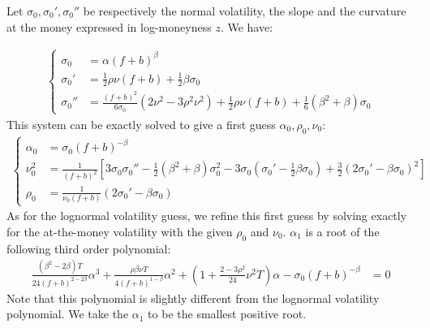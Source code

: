 \documentclass[]{rAMF2e}
\begin{document}
Let $\sigma_0, \sigma_0', \sigma_0''$ be respectively the normal volatility, the slope and the curvature at the money expressed in log-moneyness $z$. We have:

\begin{align}
\begin{cases}
\sigma_0 &= \alpha (f+b)^{\beta}\\
\sigma_0' &= \frac{1}{2}\rho \nu (f+b) + \frac{1}{2} \beta \sigma_0\\
\sigma_0'' &= \frac{(f+b)^2}{6\sigma_0}(2\nu^2 - 3\rho^2\nu^2)+\frac{1}{2} \rho \nu (f+b)+\frac{1}{6}(\beta^2+\beta)\sigma_0
\end{cases}
\end{align}
This system can be exactly solved to give a first guess $\alpha_0, \rho_0,\nu_0$:
\begin{align}
  \begin{cases}
\alpha_0 &=  \sigma_0 (f+b)^{-\beta}\\
\nu_0^2 &= \frac{1}{(f+b)^2}\left[ 3\sigma_0\sigma_0''-\frac{1}{2}(\beta^2+\beta)\sigma_0^2-3\sigma_0(\sigma_0'-\frac{1}{2}\beta\sigma_0) +\frac{3}{2}\left(2\sigma_0'-\beta\sigma_0\right)^2\right] \\
\rho_0 &= \frac{1}{\nu_0 (f+b)}\left(2\sigma_0'-\beta\sigma_0\right) 
\end{cases} 
\end{align}
As for the lognormal volatility guess, we refine this first guess by solving exactly for the at-the-money volatility with the given $\rho_0$ and $\nu_0$. $\alpha_1$ is a root of the following third order polynomial:
\begin{align}
\frac{(\beta^2-2\beta) T}{24 (f+b)^{2-2\beta}}\alpha^3+ \frac{\rho\beta\nu T}{4(f+b)^{1-\beta}}\alpha^2 + \left(1+\frac{2-3\rho^2}{24}\nu^2 T\right)\alpha - \sigma_0 (f+b)^{-\beta} &= 0
\end{align}
Note that this polynomial is slightly different from the lognormal volatility polynomial. We take the $\alpha_1$ to be the smallest positive root.
 
  
\end{document}

